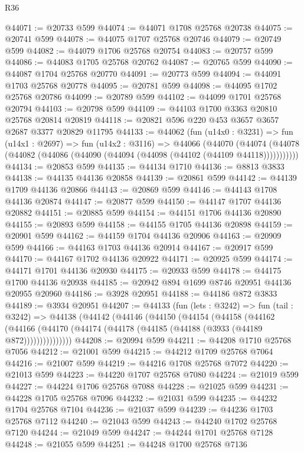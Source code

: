 \begin{lexlean}{R36}
\begin{coremodule}
@44071 := @20733 @599
@44074 := @44071 @1708 @25768 @20738
@44075 := @20741 @599
@44078 := @44075 @1707 @25768 @20746
@44079 := @20749 @599
@44082 := @44079 @1706 @25768 @20754
@44083 := @20757 @599
@44086 := @44083 @1705 @25768 @20762
@44087 := @20765 @599
@44090 := @44087 @1704 @25768 @20770
@44091 := @20773 @599
@44094 := @44091 @1703 @25768 @20778
@44095 := @20781 @599
@44098 := @44095 @1702 @25768 @20786
@44099 := @20789 @599
@44102 := @44099 @1701 @25768 @20794
@44103 := @20798 @599
@44109 := @44103 @1700 @3363 @20810 @25768 @20814 @20819
@44118 := @20821 @596 @220 @453 @3657 @3657 @2687 @3377 @20829 @11795
@44133 := @44062
    (fun (u14x0 : @3231) =>
    fun (u14x1 : @2697) =>
    fun (u14x2 : @3116) =>
    @44066
      (@44070
        (@44074 (@44078 (@44082 (@44086 (@44090 (@44094 (@44098 (@44102 (@44109 @44118)))))))))))
@44134 := @20853 @599
@44135 := @44134 @1710
@44136 := @8813 @3833
@44138 := @44135 @44136 @20858
@44139 := @20861 @599
@44142 := @44139 @1709 @44136 @20866
@44143 := @20869 @599
@44146 := @44143 @1708 @44136 @20874
@44147 := @20877 @599
@44150 := @44147 @1707 @44136 @20882
@44151 := @20885 @599
@44154 := @44151 @1706 @44136 @20890
@44155 := @20893 @599
@44158 := @44155 @1705 @44136 @20898
@44159 := @20901 @599
@44162 := @44159 @1704 @44136 @20906
@44163 := @20909 @599
@44166 := @44163 @1703 @44136 @20914
@44167 := @20917 @599
@44170 := @44167 @1702 @44136 @20922
@44171 := @20925 @599
@44174 := @44171 @1701 @44136 @20930
@44175 := @20933 @599
@44178 := @44175 @1700 @44136 @20938
@44185 := @20942 @894 @1699 @8746 @20951 @44136 @20955 @20960
@44186 := @3928 @20951
@44188 := @44186 @872 @3833
@44189 := @3934 @20951
@44207 := @44133
    (fun (lets : @3242) =>
    fun (tail : @3242) =>
    @44138
      (@44142
        (@44146
          (@44150
            (@44154
              (@44158
                (@44162
                  (@44166 (@44170 (@44174 (@44178 (@44185 (@44188 (@3933 (@44189 @872)))))))))))))))
@44208 := @20994 @599
@44211 := @44208 @1710 @25768 @7056
@44212 := @21001 @599
@44215 := @44212 @1709 @25768 @7064
@44216 := @21007 @599
@44219 := @44216 @1708 @25768 @7072
@44220 := @21013 @599
@44223 := @44220 @1707 @25768 @7080
@44224 := @21019 @599
@44227 := @44224 @1706 @25768 @7088
@44228 := @21025 @599
@44231 := @44228 @1705 @25768 @7096
@44232 := @21031 @599
@44235 := @44232 @1704 @25768 @7104
@44236 := @21037 @599
@44239 := @44236 @1703 @25768 @7112
@44240 := @21043 @599
@44243 := @44240 @1702 @25768 @7120
@44244 := @21049 @599
@44247 := @44244 @1701 @25768 @7128
@44248 := @21055 @599
@44251 := @44248 @1700 @25768 @7136

\end{coremodule}
\end{lexlean}
